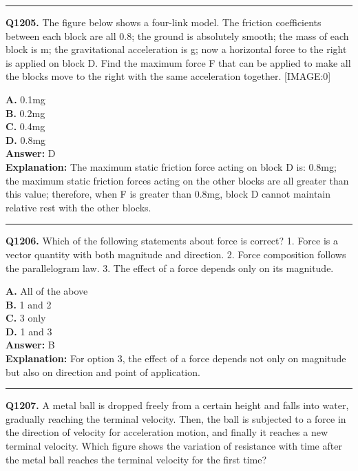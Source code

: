 \documentclass[12pt]{article}
\begin{document}
\hrule
\vspace{1em}


\noindent
\textbf{Q1205.} The figure below shows a four-link model.
The friction coefficients between each block are all 0.8; the ground is absolutely smooth; the mass of each block is m; the gravitational acceleration is g; now a horizontal force to the right is applied on block D. Find the maximum force F that can be applied to make all the blocks move to the right with the same acceleration together.
[IMAGE:0]



\textbf{A.} 0.1mg \\
\textbf{B.} 0.2mg \\
\textbf{C.} 0.4mg \\
\textbf{D.} 0.8mg \\

\textbf{Answer:} D \\
\textbf{Explanation:} The maximum static friction force acting on block D is: 0.8mg; the maximum static friction forces acting on the other blocks are all greater than this value; therefore, when F is greater than 0.8mg, block D cannot maintain relative rest with the other blocks.

\hrule
\vspace{1em}


\noindent
\textbf{Q1206.} Which of the following statements about force is correct?
1.
Force is a vector quantity with both magnitude and direction.
2.
Force composition follows the parallelogram law.
3.
The effect of a force depends only on its magnitude.



\textbf{A.} All of the above \\
\textbf{B.} 1 and 2 \\
\textbf{C.} 3 only \\
\textbf{D.} 1 and 3 \\

\textbf{Answer:} B \\
\textbf{Explanation:} For option 3, the effect of a force depends not only on magnitude but also on direction and point of application.

\hrule
\vspace{1em}


\noindent
\textbf{Q1207.} A metal ball is dropped freely from a certain height and falls into water, gradually reaching the terminal velocity. Then, the ball is subjected to a force in the direction of velocity for acceleration motion, and finally it reaches a new terminal velocity. Which figure shows the variation of resistance with time after the metal ball reaches the terminal velocity for the first time?
\end{document}
